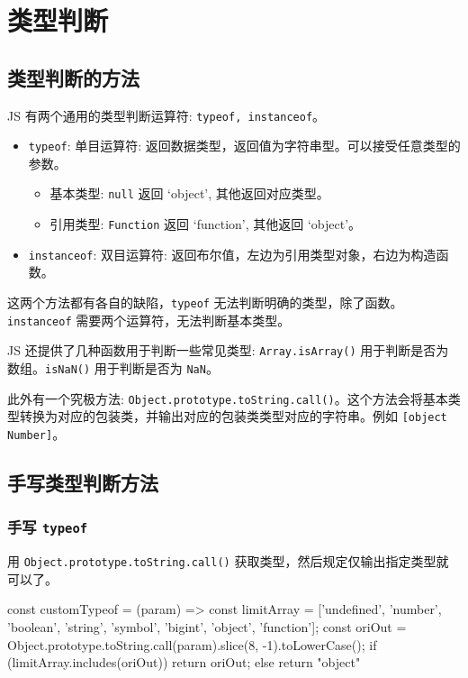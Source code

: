 \section{类型判断}

\subsection{类型判断的方法}

JS 有两个通用的类型判断运算符: \texttt{typeof, instanceof}。
\begin{itemize}
  \item \texttt{typeof}: 单目运算符: 返回数据类型，返回值为字符串型。可以接受任意类型的参数。
  \begin{itemize}
    \item 基本类型: \texttt{null} 返回 `object', 其他返回对应类型。
    \item 引用类型: \texttt{Function} 返回 `function', 其他返回 `object'。
  \end{itemize}
  \item \texttt{instanceof}: 双目运算符: 返回布尔值，左边为引用类型对象，右边为构造函数。
\end{itemize}

这两个方法都有各自的缺陷，\texttt{typeof} 无法判断明确的类型，除了函数。\texttt{instanceof} 需要两个运算符，无法判断基本类型。

JS 还提供了几种函数用于判断一些常见类型: \texttt{Array.isArray()} 用于判断是否为数组。\texttt{isNaN()} 用于判断是否为 \texttt{NaN}。

此外有一个究极方法: \texttt{Object.prototype.toString.call()}。这个方法会将基本类型转换为对应的包装类，并输出对应的包装类类型对应的字符串。例如 \texttt{[object Number]}。

\subsection{手写类型判断方法}

\subsubsection*{手写 \texttt{typeof}}

用 \texttt{Object.prototype.toString.call()} 获取类型，然后规定仅输出指定类型就可以了。

\begin{JavaScript}
const customTypeof = (param) => {
  const limitArray = ['undefined', 'number', 'boolean', 'string', 'symbol', 'bigint', 'object', 'function'];
  const oriOut = Object.prototype.toString.call(param).slice(8, -1).toLowerCase();
  if (limitArray.includes(oriOut)) {
    return oriOut;
  } else {
    return "object"
  }
}
\end{JavaScript}

